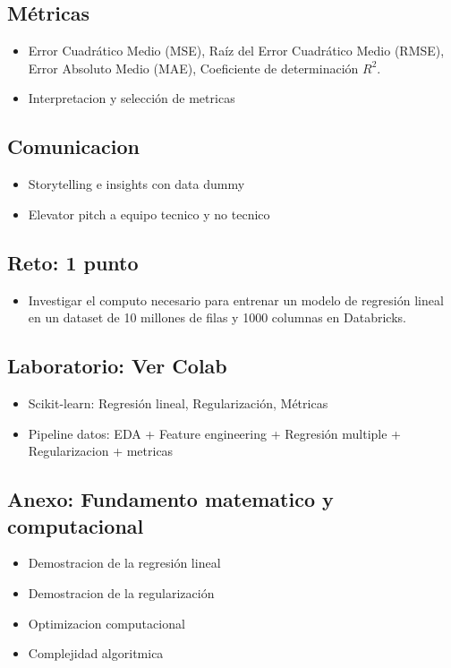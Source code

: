 \documentclass[12pt,a4paper,openany,oneside]{book}
\begin{document}
\begin{itemize}
\subsection{Métricas}
\begin{itemize}
    \item Error Cuadrático Medio (MSE), Raíz del Error Cuadrático Medio (RMSE), Error Absoluto Medio (MAE), Coeficiente de determinación \(R^2\).
    \item Interpretacion y selección de metricas
\end{itemize}

\subsection{Comunicacion}
\begin{itemize}
    \item Storytelling e insights con data dummy
    \item Elevator pitch a equipo tecnico y no tecnico
\end{itemize}

\subsection{Reto: 1 punto}
\begin{itemize}
    \item Investigar el computo necesario para entrenar un modelo de regresión lineal en un dataset de 10 millones de filas y 1000 columnas en Databricks.
\end{itemize}

\subsection{Laboratorio: Ver Colab}
\begin{itemize}
    \item Scikit-learn: Regresión lineal, Regularización, Métricas
    \item Pipeline datos: EDA + Feature engineering + Regresión multiple + Regularizacion + metricas
\end{itemize}

\subsection{Anexo: Fundamento matematico y computacional}
\begin{itemize}
    \item Demostracion de la regresión lineal
    \item Demostracion de la regularización
    \item Optimizacion computacional
    \item Complejidad algoritmica    
\end{itemize}


\end{itemize}
\end{document}
